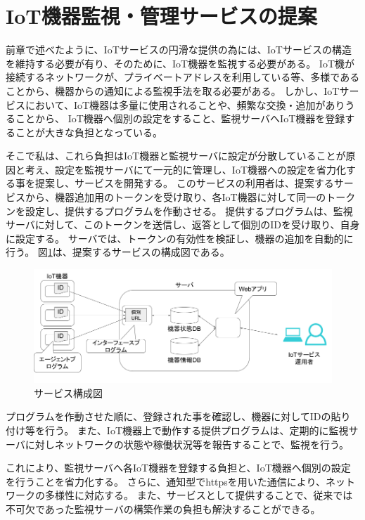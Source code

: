 \section{IoT機器監視・管理サービスの提案}
前章で述べたように、IoTサービスの円滑な提供の為には、IoTサービスの構造を維持する必要が有り、そのために、IoT機器を監視する必要がある。
IoT機が接続するネットワークが、プライベートアドレスを利用している等、多様であることから、機器からの通知による監視手法を取る必要がある。
しかし、IoTサービスにおいて、IoT機器は多量に使用されることや、頻繁な交換・追加がありうることから、
IoT機器へ個別の設定をすること、監視サーバへIoT機器を登録することが大きな負担となっている。

そこで私は、これら負担はIoT機器と監視サーバに設定が分散していることが原因と考え、設定を監視サーバにて一元的に管理し、IoT機器への設定を省力化する事を提案し、サービスを開発する。
このサービスの利用者は、提案するサービスから、機器追加用のトークンを受け取り、各IoT機器に対して同一のトークンを設定し、提供するプログラムを作動させる。
提供するプログラムは、監視サーバに対して、このトークンを送信し、返答として個別のIDを受け取り、自身に設定する。
サーバでは、トークンの有効性を検証し、機器の追加を自動的に行う。
図\ref{fig:prop_diag}は、提案するサービスの構成図である。
\begin{figure}[htbp]
\includegraphics[width=16cm]{images/prop_diag.png}
\caption{サービス構成図}
\label{fig:prop_diag}
\end{figure}

プログラムを作動させた順に、登録された事を確認し、機器に対してIDの貼り付け等を行う。
また、IoT機器上で動作する提供プログラムは、定期的に監視サーバに対しネットワークの状態や稼働状況等を報告することで、監視を行う。

これにより、監視サーバへ各IoT機器を登録する負担と、IoT機器へ個別の設定を行うことを省力化する。
さらに、通知型でhttpsを用いた通信により、ネットワークの多様性に対応する。
また、サービスとして提供することで、従来では不可欠であった監視サーバの構築作業の負担も解決することができる。

